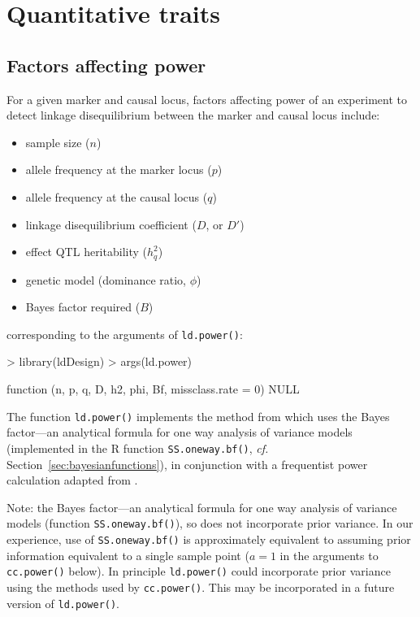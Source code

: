 \documentclass[a4paper,10pt]{amsart}
\def\cf{\textit{cf.}}
\begin{document}


\section{Quantitative traits}
\subsection{Factors affecting power}

For a given marker and causal locus, factors affecting power of an experiment
to detect linkage disequilibrium between the marker and causal locus include:
\begin{itemize}
\item sample size ($n$)
\item allele frequency at the marker locus ($p$)
\item allele frequency at the causal locus ($q$)
\item linkage disequilibrium coefficient ($D$, or $D'$)
\item effect QTL heritability ($h^2_q$)
\item genetic model (dominance ratio, $\phi$)
\item Bayes factor required ($B$)
\end{itemize}
corresponding to the arguments of \texttt{ld.power()}:

\begin{Schunk}
\begin{Sinput}
> library(ldDesign) 
> args(ld.power) 
\end{Sinput}
\begin{Soutput}
function (n, p, q, D, h2, phi, Bf, missclass.rate = 0) 
NULL
\end{Soutput}
\end{Schunk}

The function \texttt{ld.power()} implements the method from
\cite{Ball2005exptdesignbf} which uses the \cite{SpiegelhalterSmith82}
Bayes factor---an analytical formula for one way analysis of variance
models (implemented in the R function \texttt{SS.oneway.bf()}, \cf{}
Section~\ref{sec:bayesianfunctions}), in conjunction with a frequentist
power calculation adapted from \cite{Luo1998}.

Note: the \cite{SpiegelhalterSmith82} Bayes factor---an analytical
formula for one way analysis of variance models (function
\texttt{SS.oneway.bf()}), so does not incorporate prior variance. In
our experience, use of \texttt{SS.oneway.bf()} is approximately
equivalent to assuming prior information equivalent to a single sample
point ($a=1$ in the arguments to \texttt{cc.power()} below). 
In principle \texttt{ld.power()} could incorporate prior variance using 
the methods used by \texttt{cc.power()}. This may be incorporated in
a future version of \texttt{ld.power()}.
\end{document}
